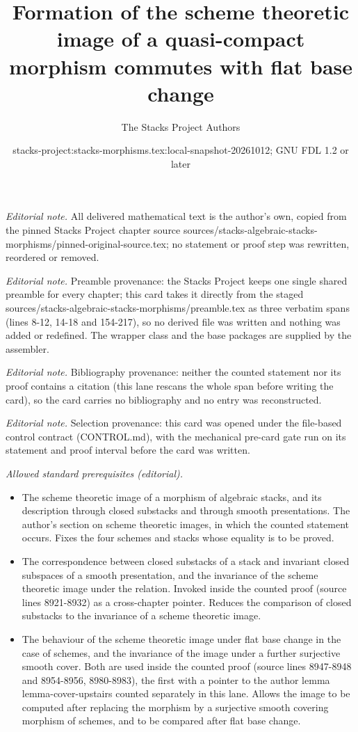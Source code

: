 \documentclass[10pt,a4paper]{amsart}
\title{Formation of the scheme theoretic image of a quasi-compact morphism commutes with flat base change}
\author{The Stacks Project Authors}
\date{stacks-project:stacks-morphisms.tex:local-snapshot-20261012; GNU FDL 1.2 or later}
\theoremstyle{plain}
\theoremstyle{definition}
\theoremstyle{remark}
\numberwithin{equation}{subsection}
\begin{document}
\maketitle
\noindent\textit{Editorial note.} All delivered mathematical text is the author's own, copied from the pinned Stacks Project chapter source sources/stacks-algebraic-stacks-morphisms/pinned-original-source.tex; no statement or proof step was rewritten, reordered or removed.\par\medskip
\noindent\textit{Editorial note.} Preamble provenance: the Stacks Project keeps one single shared preamble for every chapter; this card takes it directly from the staged sources/stacks-algebraic-stacks-morphisms/preamble.tex as three verbatim spans (lines 8-12, 14-18 and 154-217), so no derived file was written and nothing was added or redefined. The wrapper class and the base packages are supplied by the assembler.\par\medskip
\noindent\textit{Editorial note.} Bibliography provenance: neither the counted statement nor its proof contains a citation (this lane rescans the whole span before writing the card), so the card carries no bibliography and no entry was reconstructed.\par\medskip
\noindent\textit{Editorial note.} Selection provenance: this card was opened under the file-based control contract (CONTROL.md), with the mechanical pre-card gate run on its statement and proof interval before the card was written.\par\medskip
\noindent\textit{Allowed standard prerequisites (editorial).}\begin{itemize}
\item The scheme theoretic image of a morphism of algebraic stacks, and its description through closed substacks and through smooth presentations. The author's section on scheme theoretic images, in which the counted statement occurs. Fixes the four schemes and stacks whose equality is to be proved.
\item The correspondence between closed substacks of a stack and invariant closed subspaces of a smooth presentation, and the invariance of the scheme theoretic image under the relation. Invoked inside the counted proof (source lines 8921-8932) as a cross-chapter pointer. Reduces the comparison of closed substacks to the invariance of a scheme theoretic image.
\item The behaviour of the scheme theoretic image under flat base change in the case of schemes, and the invariance of the image under a further surjective smooth cover. Both are used inside the counted proof (source lines 8947-8948 and 8954-8956, 8980-8983), the first with a pointer to the author lemma lemma-cover-upstairs counted separately in this lane. Allows the image to be computed after replacing the morphism by a surjective smooth covering morphism of schemes, and to be compared after flat base change.
\end{itemize}\medskip
\end{document}
